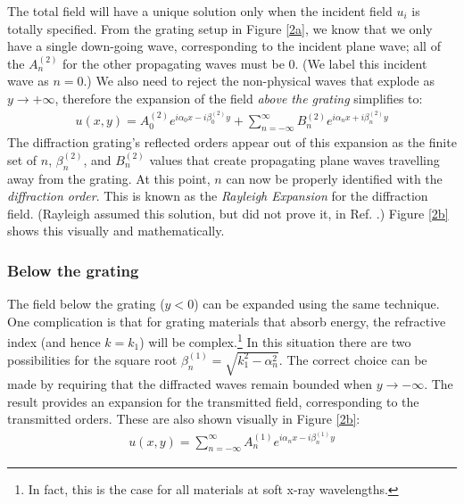 The total field will have a unique solution only when the incident field $u_i$ is totally specified.  From the grating setup in Figure \ref{2a}, we know that we only have a single down-going wave, corresponding to the incident plane wave; all of the $A^{(2)}_n$ for the other propagating waves must be 0.  (We label this incident wave as $n=0$.)  We also need to reject the non-physical waves that explode as $y \rightarrow +\infty$, therefore the expansion of the field \emph{above the grating} simplifies to:
\begin{eqnarray}
u(x,y) =  A^{(2)}_0 e^{i \alpha_0 x - i \beta^{(2)}_0 y} +  \sum_{n=-\infty}^{\infty} B^{(2)}_n e^{i \alpha_n x + i \beta^{(2)}_n y}
\label{rayleighExp2}
\end{eqnarray}
The diffraction grating's reflected orders appear out of this expansion as the finite set of $n$, $\beta^{(2)}_n$, and $B^{(2)}_n$ values that create propagating plane waves travelling away from the grating.  At this point, $n$ can now be properly identified with the \emph{diffraction order}.  This is known as the \emph{Rayleigh Expansion} for the diffraction field.  (Rayleigh assumed this solution, but did not prove it, in Ref. \cite{Ray07}.)  Figure \ref{2b} shows this visually and mathematically. 

\subsubsection{Below the grating}
The field below the grating ($y<0$) can be expanded using the same  technique.  One complication is that for grating materials that absorb energy, the refractive index (and hence $k=k_1$) will be complex.\footnote{In fact, this is the case for all materials at soft x-ray wavelengths.}  In this situation there are two possibilities for the square root $\beta^{(1)}_n = \sqrt{k_1^2-\alpha_n^2}$.  The correct choice can be made by requiring that the diffracted waves remain bounded when $y\rightarrow -\infty$.  The result provides an expansion for the transmitted field, corresponding to the transmitted orders.  These are also shown visually in Figure \ref{2b}:
\begin{eqnarray}
\label{gratingEqnT}
u(x,y) =  \sum_{n=-\infty}^{\infty} A^{(1)}_{n} e^{i \alpha_n x - i \beta^{(1)}_{n} y}
\label{rayleighExp1}
\end{eqnarray}


